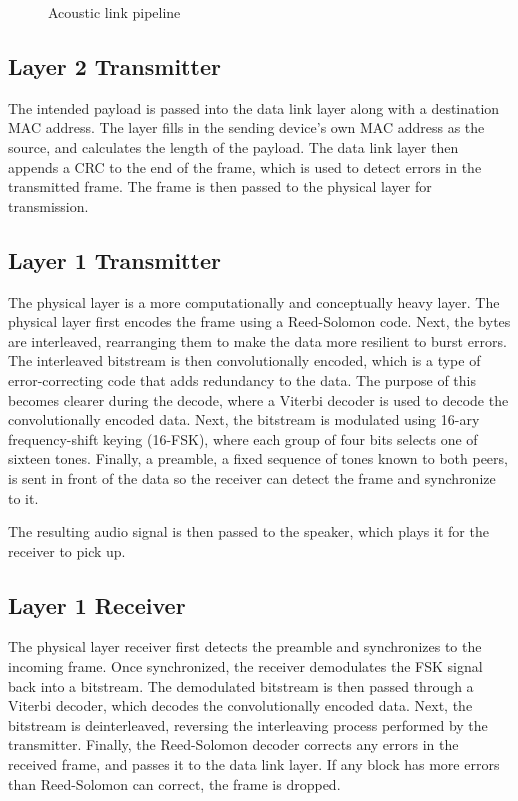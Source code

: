 \documentclass{article}
\begin{document}
\begin{figure}[H]
{
}%
\caption{Acoustic link pipeline}
\label{fig:acoustic-pipeline}
\end{figure}

\subsection{Layer 2 Transmitter}
The intended payload is passed into the data link layer along with a destination MAC address. The layer fills in the sending device's own MAC address as the source, and calculates the length of the payload.
The data link layer then appends a CRC to the end of the frame, which is used to detect errors in the transmitted frame. The frame is then passed to the physical 
layer for transmission.

\subsection{Layer 1 Transmitter}
The physical layer is a more computationally and conceptually heavy layer. The physical layer first encodes the frame using a Reed-Solomon code. Next, the bytes are interleaved, rearranging them to make the
data more resilient to burst errors. The interleaved bitstream is then convolutionally encoded,
which is a type of error-correcting code that adds redundancy to the data. The purpose of this becomes clearer during the decode, where a Viterbi decoder is
used to decode the convolutionally encoded data. Next, the bitstream is modulated using 16-ary frequency-shift keying (16-FSK), where each group of four bits selects one of sixteen tones.
Finally, a preamble, a fixed sequence of tones known to both peers, is sent in front of the data so the receiver can detect the frame and synchronize to it.

The resulting audio signal is then passed to the speaker, which plays it for the receiver to pick up.
\subsection{Layer 1 Receiver}
The physical layer receiver first detects the preamble and synchronizes to the incoming frame. Once synchronized, the receiver demodulates the FSK signal back into a bitstream.
The demodulated bitstream is then passed through a Viterbi decoder, which decodes the convolutionally encoded data. Next, the bitstream is deinterleaved, 
reversing the interleaving process performed by the transmitter. Finally, the Reed-Solomon decoder corrects any errors in the received frame, and passes it to the data link layer. If any block has more errors than Reed-Solomon can correct, the frame is dropped. 
\end{document}
